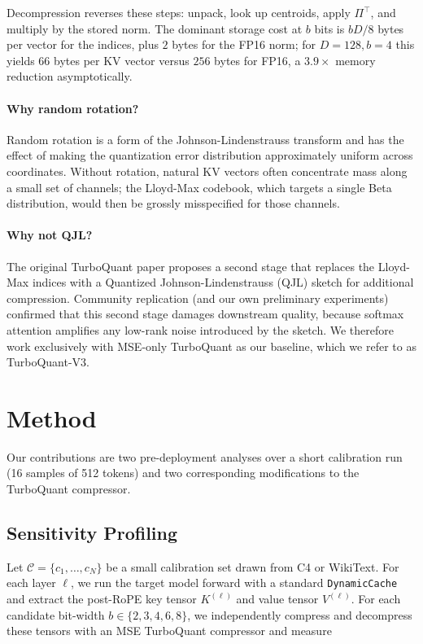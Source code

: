 \documentclass[11pt]{article}
\begin{document}
Decompression reverses these steps: unpack, look up centroids, apply $\Pi^\top$, and multiply by the stored norm. The dominant storage cost at $b$ bits is $bD/8$ bytes per vector for the indices, plus $2$ bytes for the FP16 norm; for $D=128, b=4$ this yields $66$ bytes per KV vector versus $256$ bytes for FP16, a $3.9\times$ memory reduction asymptotically.

\paragraph{Why random rotation?}
Random rotation is a form of the Johnson-Lindenstrauss transform and has the effect of making the quantization error distribution approximately uniform across coordinates. Without rotation, natural KV vectors often concentrate mass along a small set of channels; the Lloyd-Max codebook, which targets a single Beta distribution, would then be grossly misspecified for those channels.

\paragraph{Why not QJL?}
The original TurboQuant paper proposes a second stage that replaces the Lloyd-Max indices with a Quantized Johnson-Lindenstrauss (QJL) sketch for additional compression. Community replication (and our own preliminary experiments) confirmed that this second stage damages downstream quality, because softmax attention amplifies any low-rank noise introduced by the sketch. We therefore work exclusively with MSE-only TurboQuant as our baseline, which we refer to as TurboQuant-V3.

\section{Method}
\label{sec:method}

Our contributions are two pre-deployment analyses over a short calibration run (16 samples of 512 tokens) and two corresponding modifications to the TurboQuant compressor.

\subsection{Sensitivity Profiling}
\label{sec:sensitivity}

Let $\mathcal{C} = \{c_1, \ldots, c_N\}$ be a small calibration set drawn from C4 or WikiText. For each layer $\ell$, we run the target model forward with a standard \texttt{DynamicCache} and extract the post-RoPE key tensor $K^{(\ell)}$ and value tensor $V^{(\ell)}$. For each candidate bit-width $b \in \{2, 3, 4, 6, 8\}$, we independently compress and decompress these tensors with an MSE TurboQuant compressor and measure
\end{document}
